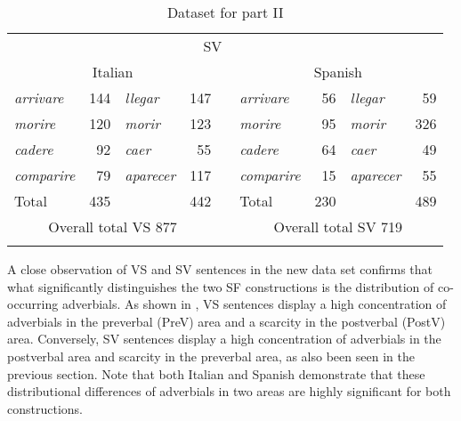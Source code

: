 \documentclass[output=paper,colorlinks,citecolor=brown,
]{langscibook}
\begin{document}
\begin{table}
    \begin{tabular}{lrlrllrlr}\lsptoprule
\multicolumn{4}{c}{VS} && \multicolumn{4}{c}{SV}\\ 
       \multicolumn{4}{c}{Italian} && \multicolumn{4}{c}{Spanish}\\ 
       \midrule
\textit{arrivare} & 144 & \textit{llegar} & 147 && \textit{arrivare} & 56 & \textit{llegar} & 59\\ 
\textit{morire} & 120 & \textit{morir} & 123 && \textit{morire} & 95 &
\textit{morir} & 326\\ 
\textit{cadere} & 92 & \textit{caer} & 55 && \textit{cadere} & 64 & \textit{caer} & 49\\ 
\textit{comparire} & 79 & \textit{aparecer} & 117 && \textit{comparire} & 15 & \textit{aparecer} & 55\\
Total & 435 & & 442 && Total & 230 & & 489\\
\multicolumn{4}{c}{Overall total VS 877} && \multicolumn{4}{c}{Overall total SV 719} \\ 
\lspbottomrule
    \end{tabular}
    \caption{Dataset for part II}
    \label{tab:nishida:3}
\end{table}

\newpage
A close observation of VS and SV sentences in the new data set confirms that what significantly distinguishes the two SF constructions is the distribution of co-occurring adverbials. As shown in , VS sentences display a high concentration of adverbials in the preverbal (PreV) area and a scarcity in the postverbal (PostV) area. Conversely, SV sentences display a high concentration of adverbials in the postverbal area and scarcity in the preverbal area, as also been seen in the previous section. Note that both Italian and Spanish demonstrate that these distributional differences of adverbials in two areas are highly significant for both constructions. 
\end{document}

